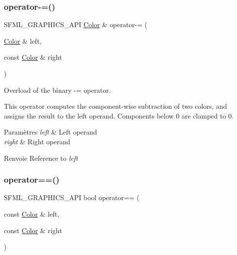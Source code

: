 \subsubsection{\texorpdfstring{operator-\/=()}{operator-=()}}
{\footnotesize\ttfamily S\+F\+M\+L\+\_\+\+G\+R\+A\+P\+H\+I\+C\+S\+\_\+\+A\+PI \hyperlink{classsf_1_1Color}{Color} \& operator-\/= (\begin{DoxyParamCaption}\item[{\hyperlink{classsf_1_1Color}{Color} \&}]{left,  }\item[{const \hyperlink{classsf_1_1Color}{Color} \&}]{right }\end{DoxyParamCaption})\hspace{0.3cm}{\ttfamily [related]}}



Overload of the binary -\/= operator. 

This operator computes the component-\/wise subtraction of two colors, and assigns the result to the left operand. Components below 0 are clamped to 0.


\begin{DoxyParams}{Paramètres}
{\em left} & Left operand \\
\hline
{\em right} & Right operand\\
\hline
\end{DoxyParams}
\begin{DoxyReturn}{Renvoie}
Reference to {\itshape left} 
\end{DoxyReturn}
\mbox{\label{classsf_1_1Color_a7498d4670c7655e8d4d91ef49cc6064e}} 
\subsubsection{\texorpdfstring{operator==()}{operator==()}}
{\footnotesize\ttfamily S\+F\+M\+L\+\_\+\+G\+R\+A\+P\+H\+I\+C\+S\+\_\+\+A\+PI bool operator== (\begin{DoxyParamCaption}\item[{const \hyperlink{classsf_1_1Color}{Color} \&}]{left,  }\item[{const \hyperlink{classsf_1_1Color}{Color} \&}]{right }\end{DoxyParamCaption})\hspace{0.3cm}{\ttfamily [related]}}



